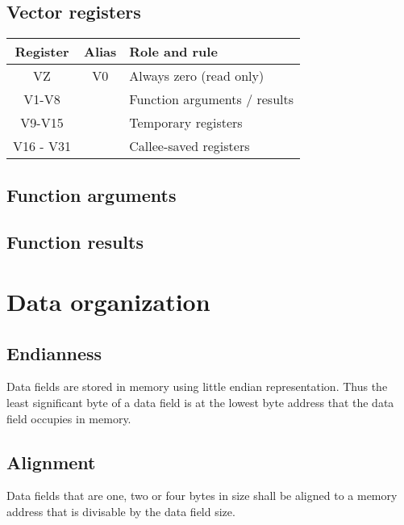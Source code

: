 
\subsection{Vector registers}

\begin{tabular}{|c|c|l|}
  \hline
  \textbf{Register} & \textbf{Alias} & \textbf{Role and rule} \\
  \hline
  VZ & V0 & Always zero (read only) \\
  \hline
  V1-V8 & & Function arguments / results \\
  \hline
  V9-V15 & & Temporary registers \\
  \hline
  V16 - V31 & & Callee-saved registers \\
  \hline
\end{tabular}


\subsection{Function arguments}

\tbd

\subsection{Function results}

\tbd

\section{Data organization}

\subsection{Endianness}

Data fields are stored in memory using little endian representation. Thus the
least significant byte of a data field is at the lowest byte address that the
data field occupies in memory.

\subsection{Alignment}

Data fields that are one, two or four bytes in size shall be aligned to a
memory address that is divisable by the data field size.

